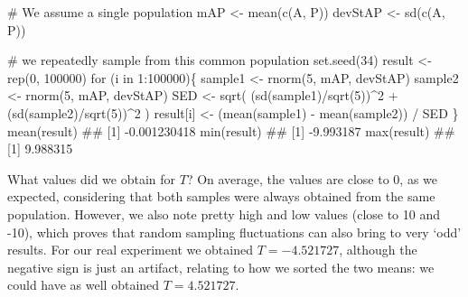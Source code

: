 \documentclass[a4paper,12pt,oneside]{book}
\newenvironment{Shaded}{\begin{snugshade}}{\end{snugshade}}
\newcommand{\DecValTok}[1]{#1}
\newcommand{\SpecialCharTok}[1]{#1}
\newcommand{\CommentTok}[1]{#1}
\newcommand{\DocumentationTok}[1]{#1}
\newcommand{\OtherTok}[1]{#1}
\newcommand{\FunctionTok}[1]{#1}
\newcommand{\ControlFlowTok}[1]{#1}
\newcommand{\NormalTok}[1]{#1}
\begin{document}
\begin{Shaded}
\begin{Highlighting}[]
\CommentTok{\# We assume a single population}
\NormalTok{mAP }\OtherTok{\textless{}{-}} \FunctionTok{mean}\NormalTok{(}\FunctionTok{c}\NormalTok{(A, P))}
\NormalTok{devStAP }\OtherTok{\textless{}{-}} \FunctionTok{sd}\NormalTok{(}\FunctionTok{c}\NormalTok{(A, P))}

\CommentTok{\# we repeatedly sample from this common population}
\FunctionTok{set.seed}\NormalTok{(}\DecValTok{34}\NormalTok{)}
\NormalTok{result }\OtherTok{\textless{}{-}} \FunctionTok{rep}\NormalTok{(}\DecValTok{0}\NormalTok{, }\DecValTok{100000}\NormalTok{)}
\ControlFlowTok{for}\NormalTok{ (i }\ControlFlowTok{in} \DecValTok{1}\SpecialCharTok{:}\DecValTok{100000}\NormalTok{)\{}
\NormalTok{  sample1 }\OtherTok{\textless{}{-}} \FunctionTok{rnorm}\NormalTok{(}\DecValTok{5}\NormalTok{, mAP, devStAP)}
\NormalTok{  sample2 }\OtherTok{\textless{}{-}} \FunctionTok{rnorm}\NormalTok{(}\DecValTok{5}\NormalTok{, mAP, devStAP)}
\NormalTok{  SED }\OtherTok{\textless{}{-}} \FunctionTok{sqrt}\NormalTok{( (}\FunctionTok{sd}\NormalTok{(sample1)}\SpecialCharTok{/}\FunctionTok{sqrt}\NormalTok{(}\DecValTok{5}\NormalTok{))}\SpecialCharTok{\^{}}\DecValTok{2} \SpecialCharTok{+}
\NormalTok{                 (}\FunctionTok{sd}\NormalTok{(sample2)}\SpecialCharTok{/}\FunctionTok{sqrt}\NormalTok{(}\DecValTok{5}\NormalTok{))}\SpecialCharTok{\^{}}\DecValTok{2}\NormalTok{ )}
\NormalTok{  result[i] }\OtherTok{\textless{}{-}}\NormalTok{ (}\FunctionTok{mean}\NormalTok{(sample1) }\SpecialCharTok{{-}} \FunctionTok{mean}\NormalTok{(sample2)) }\SpecialCharTok{/}\NormalTok{ SED}
\NormalTok{\}}
\FunctionTok{mean}\NormalTok{(result) }
\DocumentationTok{\#\# [1] {-}0.001230418}
\FunctionTok{min}\NormalTok{(result)}
\DocumentationTok{\#\# [1] {-}9.993187}
\FunctionTok{max}\NormalTok{(result)}
\DocumentationTok{\#\# [1] 9.988315}
\end{Highlighting}
\end{Shaded}

What values did we obtain for \(T\)? On average, the values are close to 0, as we expected, considering that both samples were always obtained from the same population. However, we also note pretty high and low values (close to 10 and -10), which proves that random sampling fluctuations can also bring to very `odd' results. For our real experiment we obtained \(T = -4.521727\), although the negative sign is just an artifact, relating to how we sorted the two means: we could have as well obtained \(T = 4.521727\).
\end{document}
